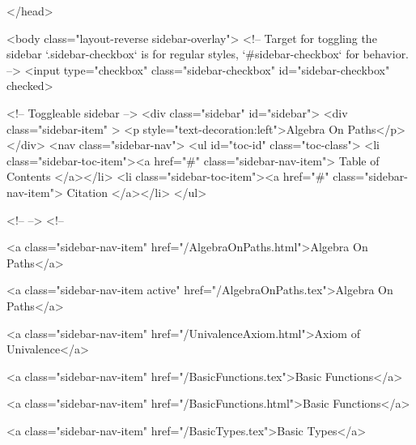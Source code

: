   
</head>




  <body class="layout-reverse sidebar-overlay">
    <!-- Target for toggling the sidebar `.sidebar-checkbox` is for regular
     styles, `#sidebar-checkbox` for behavior. -->
<input type="checkbox" class="sidebar-checkbox" id="sidebar-checkbox" checked>

<!-- Toggleable sidebar -->
<div class="sidebar" id="sidebar">
  <div class="sidebar-item" >
    <p style="text-decoration:left">Algebra On Paths</p>
  </div>
  <nav class="sidebar-nav">
    <ul id="toc-id" class="toc-class">
  <li class="sidebar-toc-item"><a href="#" class="sidebar-nav-item"> Table of Contents </a></li>
  <li class="sidebar-toc-item"><a href="#" class="sidebar-nav-item"> Citation </a></li>
</ul>


    <!--  -->
    <!-- 
      
    
      
    
      
    
      
        
      
    
      
        
          <a class="sidebar-nav-item" href="/AlgebraOnPaths.html">Algebra On Paths</a>
        
      
    
      
        
          <a class="sidebar-nav-item active" href="/AlgebraOnPaths.tex">Algebra On Paths</a>
        
      
    
      
        
          <a class="sidebar-nav-item" href="/UnivalenceAxiom.html">Axiom of Univalence</a>
        
      
    
      
        
          <a class="sidebar-nav-item" href="/BasicFunctions.tex">Basic Functions</a>
        
      
    
      
        
          <a class="sidebar-nav-item" href="/BasicFunctions.html">Basic Functions</a>
        
      
    
      
        
          <a class="sidebar-nav-item" href="/BasicTypes.tex">Basic Types</a>
        
      
    
      
        
